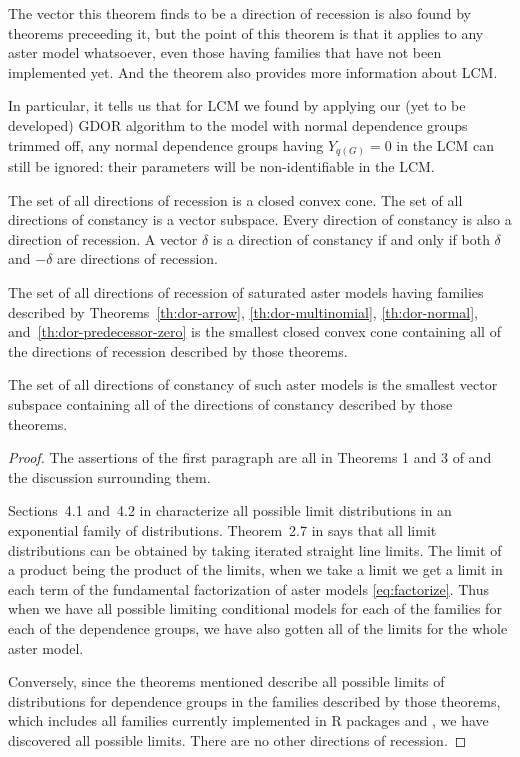 The vector this theorem finds to be a direction of recession is also found
by theorems preceeding it, but the point of this theorem is that it
applies to any aster model whatsoever, even those having families that
have not been implemented yet.  And the theorem also provides more information
about LCM.

In particular, it tells us that for LCM we found by applying our
(yet to be developed) GDOR algorithm to the model with normal dependence
groups trimmed off, any normal dependence groups having $Y_{q(G)} = 0$
in the LCM can still be ignored: their parameters will be non-identifiable
in the LCM.

\begin{theorem} \label{th:dor-aster}
The set of all directions of recession is a closed convex cone.
The set of all directions of constancy is a vector subspace.
Every direction of constancy is also a direction of recession.
A vector $\delta$ is a direction of constancy if and only if
both $\delta$ and $- \delta$ are directions of recession.

The set of all directions of recession of saturated aster models
having families described by Theorems~\ref{th:dor-arrow},
\ref{th:dor-multinomial}, \ref{th:dor-normal},
and~\ref{th:dor-predecessor-zero}
is the smallest closed convex cone containing all of the directions
of recession described by those theorems.

The set of all directions of constancy of such aster models
is the smallest vector subspace containing all of the directions
of constancy described by those theorems.
\end{theorem}
\begin{proof}
The assertions of the first paragraph are all in Theorems 1 and 3 of
\citet{geyer-gdor} and the discussion surrounding them.

Sections~4.1 and~{4.2} in \citet{geyer-thesis} characterize all possible
limit distributions in an exponential family of distributions.
Theorem~{2.7} in \citet{geyer-thesis} says that all limit distributions
can be obtained by taking iterated straight line limits.
The limit of a product being the product of the limits, when we take a
limit we get a limit in each term of the fundamental factorization of
aster models \eqref{eq:factorize}.
Thus when we have all possible limiting conditional models for each of
the families for each of the dependence groups, we have also gotten
all of the limits for the whole aster model.

Conversely, since the theorems mentioned describe all possible limits
of distributions for dependence groups in the families described by
those theorems, which includes all families currently implemented in
R packages  and , we have discovered all
possible limits.  There are no other directions of recession.
\end{proof}

